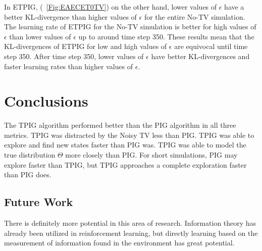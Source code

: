 \documentclass[12pt]{thesis}
\begin{document}
In ETPIG, (\figurename~\ref{Fig:EAECET0TV}) on the other hand, lower values of $\epsilon$ have a better KL-divergence than higher values of $\epsilon$ for the entire No-TV simulation. The learning rate of ETPIG for the No-TV simulation is better for high values of $\epsilon$ than lower values of $\epsilon$ up to around time step 350. These results mean that the KL-divergences of ETPIG for low and high values of $\epsilon$ are equivocal until time step 350. After time step 350, lower values of $\epsilon$ have better KL-divergences and faster learning rates than higher values of $\epsilon$.




\chapter{Conclusions}
The TPIG algorithm performed better than the PIG algorithm in all three metrics. TPIG was distracted by the Noisy TV less than PIG. TPIG was able to explore and find new states faster than PIG was. TPIG was able to model the true distribution $\Theta$ more closely than PIG. For short simulations, PIG may explore faster than TPIG, but TPIG approaches a complete exploration faster than PIG does.
\section{Future Work}
There is definitely more potential in this area of research. Information theory has already been utilized in reinforcement learning, but directly learning based on the measurement of information found in the environment has great potential. 
\end{document}
